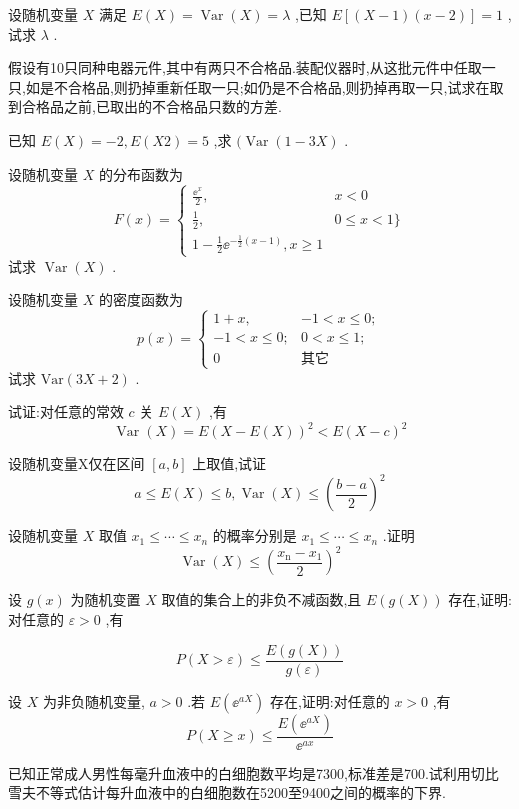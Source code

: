 \begin{xiti}
\item 设随机变量 $ X $ 满足 $ E(X)=\operatorname{Var}(X)=\lambda $ ,已知 $ E[(X-1)(x-2)]=1 $ ,试求 $ \lambda $ .
\item 假设有10只同种电器元件,其中有两只不合格品.装配仪器时,从这批元件中任取一只,如是不合格品,则扔掉重新任取一只;如仍是不合格品,则扔掉再取一只,试求在取到合格品之前,已取出的不合格品只数的方差.
\item 已知 $ E(X)=-2,E(X2)=5 $ ,求 $ (\operatorname{Var}(1-3 X) $ .
\item 设随机变量 $ X $ 的分布函数为
\[
F(x)=\left\{\begin{array}{ll}
{\frac{\ee ^{x}}{2} ,} & {x<0} \\ 
{\frac{1}{2},} & {0 \leqslant x<1 \}} \\ 
{1-\frac{1}{2} \ee ^{-\frac{1}{2}(x-1)}, x \geqslant 1}
\end{array}\right.
\]
试求 $ \operatorname{Var}(X) $ .
\item 设随机变量 $ X $ 的密度函数为
\[
p(x)=\left\{\begin{array}{ll}
{1+x,} & {-1<x \leqslant 0 ;} \\ 
{-1<x \leqslant 0 ;} & {0<x \leqslant 1 ;} \\ 
{0} & {\text{其它}}
\end{array}\right.
\]
试求 $ \mathrm{Var}(3 X+2) $ .
\item 试证:对任意的常效 $ c $ 关 $ E(X) $ ,有
\[
\operatorname{Var}(X)=E(X-E(X))^{2}<E(X-c)^{2}
\]
\item 设随机变量X仅在区间 $ [a, b] $ 上取值,试证
\[
a \leqslant E(X) \leqslant b, \operatorname{Var}(X) \leqslant\left(\frac{b-a}{2}\right)^{2}
\]
\item 设随机变量 $ X $ 取值 $ x_{1} \leqslant \cdots \leqslant x_{n} $ 的概率分别是 $ x_{1} \leqslant \cdots \leqslant x_{n} $ .证明
\[
\operatorname{Var}(X) \leqslant\left(\frac{x_{\mathrm{n}}-x_{1}}{2}\right)^{2}
\]
\item 设 $ g(x) $ 为随机变置 $ X $ 取值的集合上的非负不减函数,且 $ E(g(X)) $ 存在,证明:对任意的 $ \varepsilon>0 $ ,有

\[
P(X>\varepsilon) \leqslant \frac{E(g(X))}{g(\varepsilon)}
\]
\item 设 $ X $ 为非负随机变量, $ a>0 $ .若 $ E\left(\ee ^{a X}\right) $ 存在,证明:对任意的 $ x>0 $ ,有
\[
P(X \geqslant x) \leqslant \frac{E\left(\ee ^{a X}\right)}{\ee ^{a x}}
\]
\item 已知正常成人男性每毫升血液中的白细胞数平均是7300,标准差是700.试利用切比雪夫不等式估计每升血液中的白细胞数在5200至9400之间的概率的下界.
\end{xiti}

